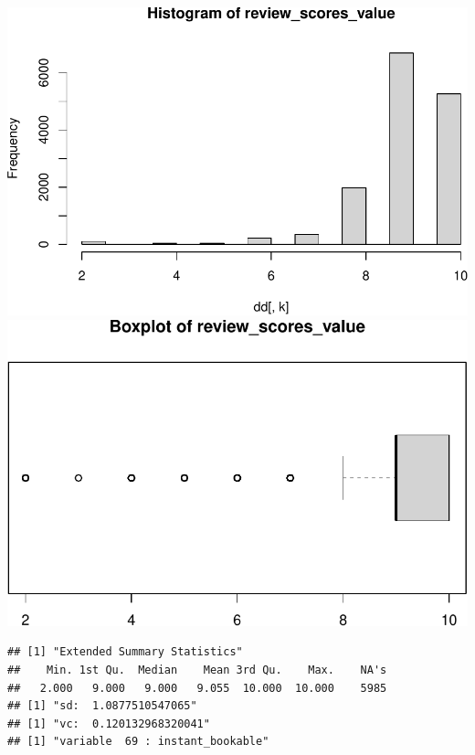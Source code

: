 \includegraphics{anal_files/figure-latex/unnamed-chunk-7-54.pdf}
\includegraphics{anal_files/figure-latex/unnamed-chunk-7-55.pdf}

\begin{verbatim}
## [1] "Extended Summary Statistics"
##    Min. 1st Qu.  Median    Mean 3rd Qu.    Max.    NA's 
##   2.000   9.000   9.000   9.055  10.000  10.000    5985 
## [1] "sd:  1.0877510547065"
## [1] "vc:  0.120132968320041"
## [1] "variable  69 : instant_bookable"
\end{verbatim}

